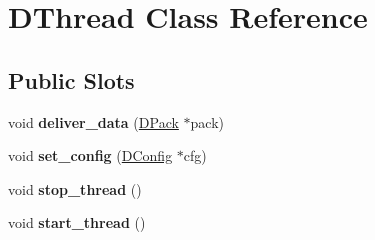 \hypertarget{class_d_thread}{
\section{DThread Class Reference}
\label{class_d_thread}
}
\subsection*{Public Slots}
\begin{DoxyCompactItemize}
\item 
\hypertarget{class_d_thread_acb227b21c83bffd0120112fcf18d0713}{
void {\bfseries deliver\_\-data} (\hyperlink{struct_d_pack}{DPack} $\ast$pack)}
\label{class_d_thread_acb227b21c83bffd0120112fcf18d0713}

\item 
\hypertarget{class_d_thread_a740457d07f282ab8b6131252287bc14d}{
void {\bfseries set\_\-config} (\hyperlink{class_d_config}{DConfig} $\ast$cfg)}
\label{class_d_thread_a740457d07f282ab8b6131252287bc14d}

\item 
\hypertarget{class_d_thread_a8d8e1f1c17d6fbe700ff126d76d17187}{
void {\bfseries stop\_\-thread} ()}
\label{class_d_thread_a8d8e1f1c17d6fbe700ff126d76d17187}

\item 
\hypertarget{class_d_thread_acca0afdb09b445aa52408c86ce3e38a5}{
void {\bfseries start\_\-thread} ()}
\label{class_d_thread_acca0afdb09b445aa52408c86ce3e38a5}

\end{DoxyCompactItemize}
